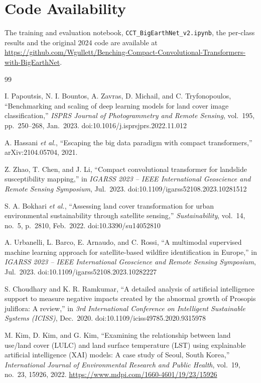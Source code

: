 \documentclass[11pt]{article}
\begin{document}
\section*{Code Availability}

The training and evaluation notebook, \texttt{CCT\_BigEarthNet\_v2.ipynb}, the per-class results and the
original 2024 code are available at
\url{https://github.com/Wgullett/Benching-Compact-Convolutional-Transformers-with-BigEarthNet}.

\begin{thebibliography}{99}

 I. Papoutsis, N. I. Bountos, A. Zavras, D. Michail, and C. Tryfonopoulos,
``Benchmarking and scaling of deep learning models for land cover image classification,''
\emph{ISPRS Journal of Photogrammetry and Remote Sensing}, vol.~195, pp.~250--268, Jan.~2023.
doi:10.1016/j.isprsjprs.2022.11.012

 A. Hassani \emph{et al.}, ``Escaping the big data paradigm with compact transformers,''
arXiv:2104.05704, 2021.

 Z. Zhao, T. Chen, and J. Li, ``Compact convolutional transformer for landslide
susceptibility mapping,'' in \emph{IGARSS 2023 -- IEEE International Geoscience and Remote Sensing
Symposium}, Jul.~2023. doi:10.1109/igarss52108.2023.10281512

 S. A. Bokhari \emph{et al.}, ``Assessing land cover transformation for urban
environmental sustainability through satellite sensing,'' \emph{Sustainability}, vol.~14, no.~5, p.~2810,
Feb.~2022. doi:10.3390/su14052810

 A. Urbanelli, L. Barco, E. Arnaudo, and C. Rossi, ``A multimodal supervised machine
learning approach for satellite-based wildfire identification in Europe,'' in \emph{IGARSS 2023 -- IEEE
International Geoscience and Remote Sensing Symposium}, Jul.~2023. doi:10.1109/igarss52108.2023.10282227

 S. Choudhary and K. R. Ramkumar, ``A detailed analysis of artificial intelligence
support to measure negative impacts created by the abnormal growth of Prosopis juliflora: A review,'' in
\emph{3rd International Conference on Intelligent Sustainable Systems (ICISS)}, Dec.~2020.
doi:10.1109/iciss49785.2020.9315978

 M. Kim, D. Kim, and G. Kim, ``Examining the relationship between land use/land cover (LULC)
and land surface temperature (LST) using explainable artificial intelligence (XAI) models: A case study of
Seoul, South Korea,'' \emph{International Journal of Environmental Research and Public Health}, vol.~19,
no.~23, 15926, 2022. \url{https://www.mdpi.com/1660-4601/19/23/15926}


\end{thebibliography}
\end{document}
